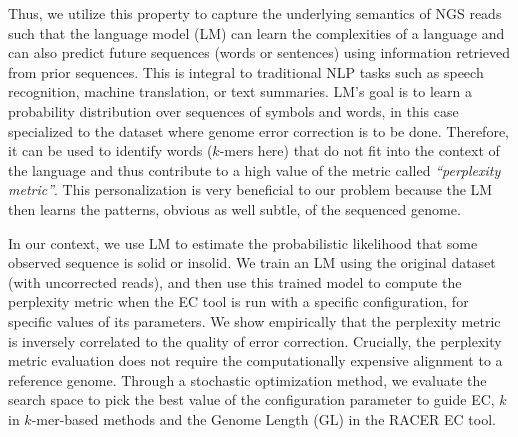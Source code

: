 Thus, we utilize this property to capture the underlying semantics of NGS reads such that the language model (LM) can learn the complexities of a language and can also predict future sequences (words or sentences) using information retrieved from prior sequences. This is integral to traditional NLP tasks such as speech recognition, machine translation, or text summaries. LM's goal is to learn a probability distribution over sequences of symbols and words,
in this case specialized to the dataset where genome error correction is to be done. 
Therefore, it can be used to identify words ($k$-mers here) that do not fit into the context of the language and thus contribute to a high value of the metric called {\em ``perplexity metric''}. This personalization is very beneficial to our problem because the LM then learns the patterns, obvious as well subtle, of the sequenced genome.

In our context, we use LM to estimate the probabilistic likelihood that some observed sequence is solid or insolid. We train an LM using the original dataset (with uncorrected reads), and then use this trained model to compute the perplexity metric when the EC tool is run with a specific configuration, \ie for specific values of its parameters. 
We show empirically that the perplexity metric is inversely correlated to the quality of error correction.
Crucially, the perplexity metric evaluation does not require the computationally expensive alignment to a reference genome.
Through a stochastic optimization method, we evaluate the search space to pick the best value of the configuration parameter to guide EC, \eg $k$ in $k$-mer-based methods and the Genome Length (GL) in the RACER EC tool. 

